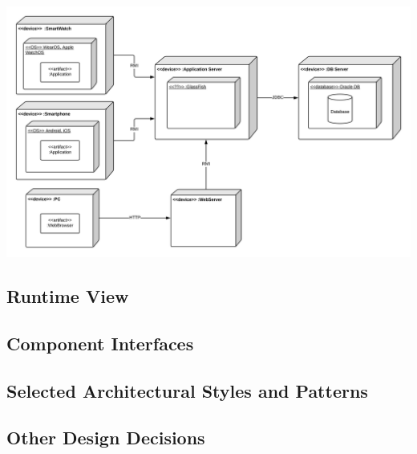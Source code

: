 \begin{center}
\includegraphics[scale=0.35]{Images/DeploymentDiagram.png}
\end{center}

\subsection{Runtime View}
\subsection{Component Interfaces}
\subsection{Selected Architectural Styles and Patterns}
\subsection{Other Design Decisions}